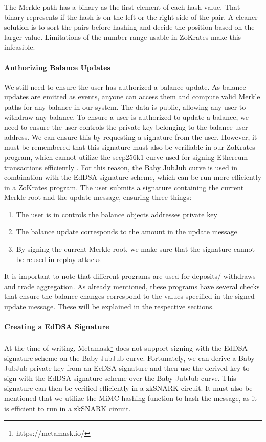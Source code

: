 \documentclass[../../thesis.tex]{subfiles}
\begin{document}
The Merkle path has a binary as the first element of each hash value. That binary represents if the hash is on the left or the right side of the pair. A cleaner solution is to sort the pairs before hashing and decide the position based on the larger value. Limitations of the number range usable in ZoKrates make this infeasible.

\paragraph{Authorizing Balance Updates}
We still need to ensure the user has authorized a balance update. As balance updates are emitted as events, anyone can access them and compute valid Merkle paths for any balance in our system. The data is public, allowing any user to withdraw any balance. To ensure a user is authorized to update a balance, we need to ensure the user controls the private key belonging to the balance user address. We can ensure this by requesting a signature from the user. However, it must be remembered that this signature must also be verifiable in our ZoKrates program, which cannot utilize the secp256k1 curve used for signing Ethereum transactions efficiently \cite{deml_2019}. For this reason, the Baby JubJub \cite{baylinaeddsa} curve is used in combination with the EdDSA signature scheme, which can be run more efficiently in a ZoKrates program. The user submits a signature containing the current Merkle root and the update message, ensuring three things:

\begin{enumerate}
    \item The user is in controls the balance objects addresses private key
    \item The balance update corresponds to the amount in the update message
    \item By signing the current Merkle root, we make sure that the signature cannot be reused in replay attacks
\end{enumerate}

It is important to note that different programs are used for deposits/ withdraws and trade aggregation. As already mentioned, these programs have several checks that ensure the balance changes correspond to the values specified in the signed update message. These will be explained in the respective sections. 

\paragraph{Creating a EdDSA Signature}
At the time of writing, Metamask\footnote{https://metamask.io/} does not support signing with the EdDSA signature scheme on the Baby JubJub curve. Fortunately, we can derive a Baby JubJub private key from an EcDSA signature and then use the derived key to sign with the EdDSA signature scheme over the Baby JubJub curve. This signature can then be verified efficiently in a zkSNARK circuit. It must also be mentioned that we utilize the MiMC hashing function to hash the message, as it is efficient to run in a zkSNARK circuit.
\end{document}
